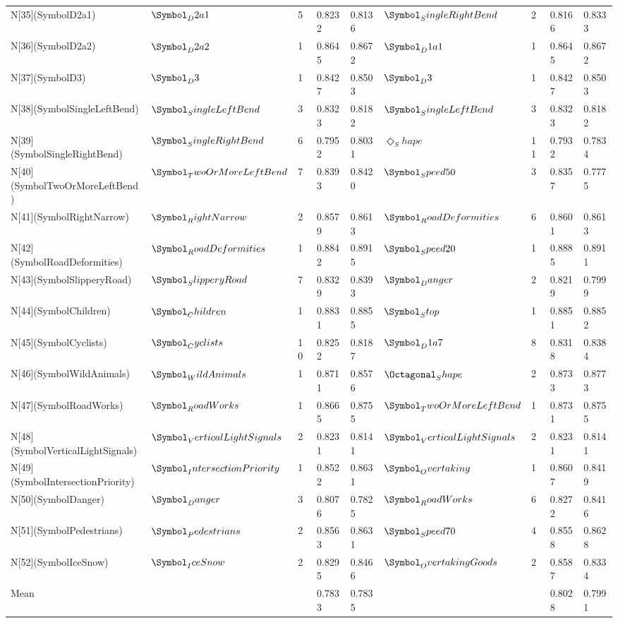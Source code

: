 \begin{tabular}{lllllllll}
N[35](SymbolD2a1) & $\Symbol_D2a1$ & 5 & 0.8232 & 0.8136 & $\Symbol_SingleRightBend$ & 2 & 0.8166 & 0.8333 \\
N[36](SymbolD2a2) & $\Symbol_D2a2$ & 1 & 0.8645 & 0.8672 & $\Symbol_D1a1$ & 1 & 0.8645 & 0.8672 \\
N[37](SymbolD3) & $\Symbol_D3$ & 1 & 0.8427 & 0.8503 & $\Symbol_D3$ & 1 & 0.8427 & 0.8503 \\
N[38](SymbolSingleLeftBend) & $\Symbol_SingleLeftBend$ & 3 & 0.8323 & 0.8182 & $\Symbol_SingleLeftBend$ & 3 & 0.8323 & 0.8182 \\
N[39](SymbolSingleRightBend) & $\Symbol_SingleRightBend$ & 6 & 0.7952 & 0.8031 & $\Diamond_Shape$ & 11 & 0.7932 & 0.7834 \\
N[40](SymbolTwoOrMoreLeftBend) & $\Symbol_TwoOrMoreLeftBend$ & 7 & 0.8393 & 0.8420 & $\Symbol_Speed50$ & 3 & 0.8357 & 0.7775 \\
N[41](SymbolRightNarrow) & $\Symbol_RightNarrow$ & 2 & 0.8579 & 0.8613 & $\Symbol_RoadDeformities$ & 6 & 0.8601 & 0.8613 \\
N[42](SymbolRoadDeformities) & $\Symbol_RoadDeformities$ & 1 & 0.8842 & 0.8915 & $\Symbol_Speed20$ & 1 & 0.8885 & 0.8911 \\
N[43](SymbolSlipperyRoad) & $\Symbol_SlipperyRoad$ & 7 & 0.8329 & 0.8393 & $\Symbol_Danger$ & 2 & 0.8219 & 0.7999 \\
N[44](SymbolChildren) & $\Symbol_Children$ & 1 & 0.8831 & 0.8855 & $\Symbol_Stop$ & 1 & 0.8851 & 0.8852 \\
N[45](SymbolCyclists) & $\Symbol_Cyclists$ & 10 & 0.8252 & 0.8187 & $\Symbol_D1a7$ & 8 & 0.8318 & 0.8384 \\
N[46](SymbolWildAnimals) & $\Symbol_WildAnimals$ & 1 & 0.8711 & 0.8576 & $\Octagonal_Shape$ & 2 & 0.8733 & 0.8773 \\
N[47](SymbolRoadWorks) & $\Symbol_RoadWorks$ & 1 & 0.8665 & 0.8755 & $\Symbol_TwoOrMoreLeftBend$ & 1 & 0.8731 & 0.8755 \\
N[48](SymbolVerticalLightSignals) & $\Symbol_VerticalLightSignals$ & 2 & 0.8231 & 0.8141 & $\Symbol_VerticalLightSignals$ & 2 & 0.8231 & 0.8141 \\
N[49](SymbolIntersectionPriority) & $\Symbol_IntersectionPriority$ & 1 & 0.8522 & 0.8631 & $\Symbol_Overtaking$ & 1 & 0.8607 & 0.8419 \\
N[50](SymbolDanger) & $\Symbol_Danger$ & 3 & 0.8076 & 0.7825 & $\Symbol_RoadWorks$ & 6 & 0.8272 & 0.8416 \\
N[51](SymbolPedestrians) & $\Symbol_Pedestrians$ & 2 & 0.8563 & 0.8631 & $\Symbol_Speed70$ & 4 & 0.8558 & 0.8628 \\
N[52](SymbolIceSnow) & $\Symbol_IceSnow$ & 2 & 0.8295 & 0.8466 & $\Symbol_OvertakingGoods$ & 2 & 0.8587 & 0.8334 \\
Mean &  &  & 0.7833 & 0.7835 &  &  & 0.8028 & 0.7991 \\
\bottomrule
\end{tabular}
